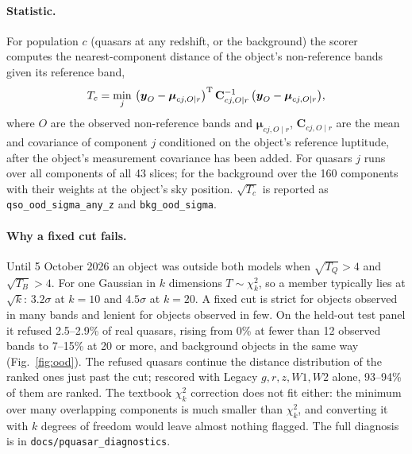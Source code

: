 \documentclass[11pt,a4paper]{article}
\newcommand{\vect}[1]{\boldsymbol{#1}}
\newcommand{\code}[1]{\texttt{#1}}
\begin{document}
\paragraph{Statistic.} For population $c$ (quasars at any redshift, or the background) the scorer computes the
nearest-component distance of the object's non-reference bands given its reference band,
\[
T_c=\min_j\,\big(\vect{y}_O-\vect{\mu}_{cj,O\mid r}\big)^{\rm T}\,\mathbf{C}_{cj,O\mid r}^{-1}\,
\big(\vect{y}_O-\vect{\mu}_{cj,O\mid r}\big),
\]
where $O$ are the observed non-reference bands and $\vect{\mu}_{cj,O\mid r}$, $\mathbf{C}_{cj,O\mid r}$ are the
mean and covariance of component $j$ conditioned on the object's reference luptitude, after the object's
measurement covariance has been added. For quasars $j$ runs over all components of all 43 slices; for the
background over the 160 components with their weights at the object's sky position. $\sqrt{T_c}$ is reported as
\code{qso\_ood\_sigma\_any\_z} and \code{bkg\_ood\_sigma}.

\paragraph{Why a fixed cut fails.} Until 5 October 2026 an object was outside both models when
$\sqrt{T_Q}>4$ and $\sqrt{T_B}>4$. For one Gaussian in $k$ dimensions $T\sim\chi^2_k$, so a member typically
lies at $\sqrt{k}$: $3.2\sigma$ at $k=10$ and $4.5\sigma$ at $k=20$. A fixed cut is strict for objects observed
in many bands and lenient for objects observed in few. On the held-out test panel it refused 2.5--2.9\% of real
quasars, rising from 0\% at fewer than 12 observed bands to 7--15\% at 20 or more, and background objects in the
same way (Fig.~\ref{fig:ood}). The refused quasars continue the distance distribution of the ranked ones just
past the cut; rescored with Legacy $g,r,z,W1,W2$ alone, 93--94\% of them are ranked. The textbook $\chi^2_k$
correction does not fit either: the minimum over many overlapping components is much smaller than $\chi^2_k$,
and converting it with $k$ degrees of freedom would leave almost nothing flagged. The full diagnosis is in
\code{docs/pquasar\_diagnostics}.
\end{document}
